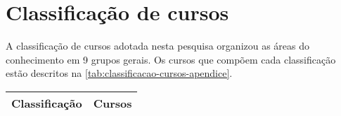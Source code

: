 \chapter{Classificação de cursos}
\label{ap:cursos}
A classificação de cursos adotada nesta pesquisa organizou as áreas do conhecimento em 9 grupos gerais. Os cursos que compõem cada classificação estão descritos na \autoref{tab:classificacao-cursos-apendice}.

\begin{longtable}[c]{ll}
    \hline
    \textbf{Classificação}                                                          & \textbf{Cursos}                                                                                                                                                                                                                                                                                                                                                                                                                                                                                                                                                                                                                                                                                                                                                                                                                                                                                                                                                                                                                                                                                                                                                                                                                                                                                                                                                                                                                                                                                                                                                                                                                                                                                                                                                                                         \\ \hline
    \endfirsthead
    \endhead

\end{longtable}
